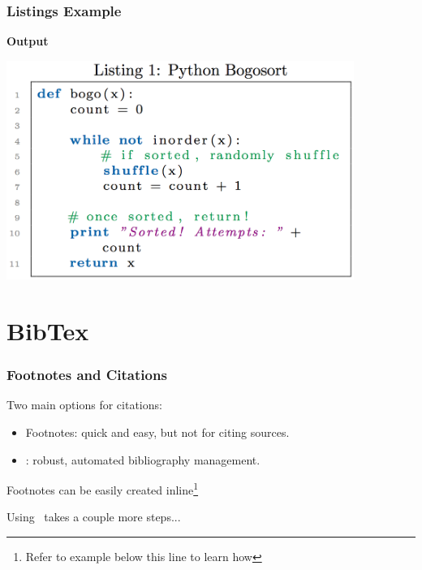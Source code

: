 \documentclass[notes=only]{beamer}
\begin{document}
\begin{frame} \frametitle{Listings Example}
    \textbf{Output}\\
    \begin{center}
    \includegraphics[width=0.85\textwidth]{Examples/9-listings.png}
    \end{center}
\end{frame}


\section{BibTex}
\begin{frame} \frametitle{Footnotes and Citations}
	Two main options for citations:
	\begin{itemize}
		\item Footnotes: quick and easy, but not for citing sources.		
		\item \BibTeX: robust, automated bibliography management.
	\end{itemize}
	\vspace{10pt}
	Footnotes can be easily created inline\footnote{Refer to example below this line to learn how}
		
	\vspace{10pt}
	Using \BibTeX\ takes a couple more steps...

\end{frame}
\end{document}
